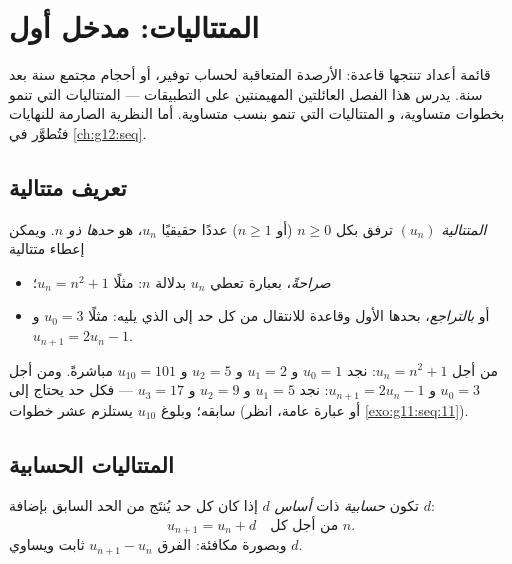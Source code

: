 \chapter{المتتاليات: مدخل أول}\label{ch:g11:seq}

 قائمة أعداد تنتجها قاعدة: الأرصدة المتعاقبة
لحساب توفير، أو أحجام مجتمع سنة بعد سنة. يدرس هذا
الفصل العائلتين المهيمنتين على التطبيقات ---
المتتاليات \emph{} التي تنمو بخطوات متساوية، و
المتتاليات \emph{} التي تنمو بنسب متساوية. أما النظرية الصارمة
للنهايات فتُطوَّر في \cref{ch:g12:seq}.

\section{تعريف متتالية}

\begin{definition}[المتتالية]\label{def:g11:seq:sequence}
\emph{المتتالية} $(u_n)$ ترفق بكل 
$n \geq 0$ (أو $n \geq 1$) عددًا حقيقيًا $u_n$، هو \emph{حدها ذو 
$n$}. ويمكن إعطاء متتالية
\begin{itemize}
  \item \emph{صراحةً}، بعبارة تعطي $u_n$ بدلالة $n$: مثلًا
        $u_n = n^2 + 1$؛
  \item أو \emph{بالتراجع}، بحدها الأول وقاعدة للانتقال من كل
        حد إلى الذي يليه: مثلًا $u_0 = 3$ و $u_{n+1} = 2u_n - 1$.
\end{itemize}
\end{definition}

\begin{example}
من أجل $u_n = n^2 + 1$: نجد $u_0 = 1$ و $u_1 = 2$ و $u_2 = 5$ و $u_{10} = 101$
مباشرةً. ومن أجل $u_0 = 3$ و $u_{n+1} = 2u_n - 1$: نجد $u_1 = 5$ و $u_2 = 9$
و $u_3 = 17$ --- فكل حد يحتاج إلى سابقه؛ وبلوغ $u_{10}$ يستلزم
عشر خطوات (أو عبارة عامة، انظر \cref{exo:g11:seq:11}).
\end{example}

\section{المتتاليات الحسابية}

\begin{definition}\label{def:g11:seq:arithmetic}
تكون  \emph{حسابية} ذات
\emph{أساس} $d$ إذا كان كل حد يُنتَج من الحد السابق
بإضافة $d$:
\[
u_{n+1} = u_n + d \quad \text{من أجل كل } n.
\]
وبصورة مكافئة: الفرق $u_{n+1} - u_n$ ثابت ويساوي $d$.
\end{definition}

